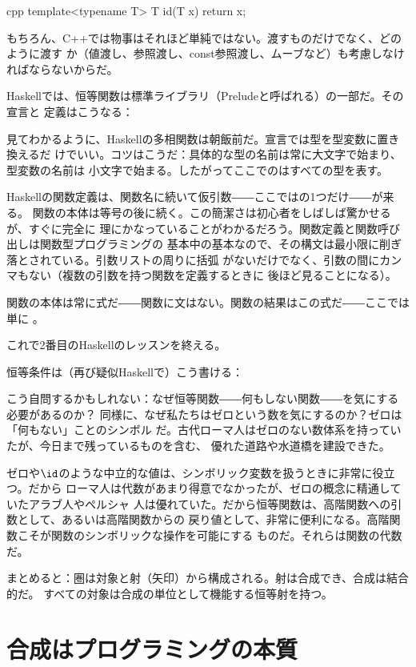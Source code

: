 \begin{snip}{cpp}
template<typename T> T id(T x) { return x; }
\end{snip}
もちろん、C++では物事はそれほど単純ではない。渡すものだけでなく、どのように渡す
か（値渡し、参照渡し、const参照渡し、ムーブなど）も考慮しなければならないからだ。

Haskellでは、恒等関数は標準ライブラリ（Preludeと呼ばれる）の一部だ。その宣言と
定義はこうなる：

見てわかるように、Haskellの多相関数は朝飯前だ。宣言では型を型変数に置き換えるだ
けでいい。コツはこうだ：具体的な型の名前は常に大文字で始まり、型変数の名前は
小文字で始まる。したがってここでのはすべての型を表す。

Haskellの関数定義は、関数名に続いて仮引数――ここではの1つだけ――が来る。
関数の本体は等号の後に続く。この簡潔さは初心者をしばしば驚かせるが、すぐに完全に
理にかなっていることがわかるだろう。関数定義と関数呼び出しは関数型プログラミングの
基本中の基本なので、その構文は最小限に削ぎ落とされている。引数リストの周りに括弧
がないだけでなく、引数の間にカンマもない（複数の引数を持つ関数を定義するときに
後ほど見ることになる）。

関数の本体は常に式だ――関数に文はない。関数の結果はこの式だ――ここでは単に
。

これで2番目のHaskellのレッスンを終える。

恒等条件は（再び疑似Haskellで）こう書ける：

こう自問するかもしれない：なぜ恒等関数――何もしない関数――を気にする必要があるのか？
同様に、なぜ私たちはゼロという数を気にするのか？ゼロは「何もない」ことのシンボル
だ。古代ローマ人はゼロのない数体系を持っていたが、今日まで残っているものを含む、
優れた道路や水道橋を建設できた。

ゼロや$\id$のような中立的な値は、シンボリック変数を扱うときに非常に役立つ。だから
ローマ人は代数があまり得意でなかったが、ゼロの概念に精通していたアラブ人やペルシャ
人は優れていた。だから恒等関数は、高階関数への引数として、あるいは高階関数からの
戻り値として、非常に便利になる。高階関数こそが関数のシンボリックな操作を可能にする
ものだ。それらは関数の代数だ。

まとめると：圏は対象と射（矢印）から構成される。射は合成でき、合成は結合的だ。
すべての対象は合成の単位として機能する恒等射を持つ。

\section{合成はプログラミングの本質}

